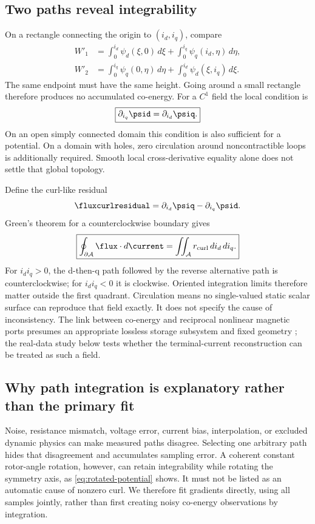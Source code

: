 \subsection{Two paths reveal integrability}
On a rectangle connecting the origin to $(i_d,i_q)$, compare
\begin{align}
 W'_1&=\int_0^{i_d}\psi_d(\xi,0)\,d\xi
        +\int_0^{i_q}\psi_q(i_d,\eta)\,d\eta,\\
 W'_2&=\int_0^{i_q}\psi_q(0,\eta)\,d\eta
        +\int_0^{i_d}\psi_d(\xi,i_q)\,d\xi.
\end{align}
The same endpoint must have the same height. Going around a small rectangle
therefore produces no accumulated co-energy. For a $C^1$ field the local
condition is
\begin{equation}
 \boxed{\partial_{i_q}\psid=\partial_{i_d}\psiq.}\label{eq:integrability}
\end{equation}
On an open simply connected domain this condition is also sufficient for a
potential. On a domain with holes, zero circulation around noncontractible
loops is additionally required. Smooth local cross-derivative equality alone
does not settle that global topology.

Define the curl-like residual
\begin{equation}
\fluxcurlresidual=\partial_{i_d}\psiq-\partial_{i_q}\psid.
\end{equation}
Green's theorem for a counterclockwise boundary gives
\begin{equation}
 \boxed{\oint_{\partial\mathcal A}\flux\cdot d\current
        =\iint_{\mathcal A}r_{\rm curl}\,di_d\,di_q.}
 \label{eq:green}
\end{equation}
For $i_di_q>0$, the d-then-q path followed by the reverse alternative
path is counterclockwise; for $i_di_q<0$ it is clockwise. Oriented integration
limits therefore matter outside the first quadrant. Circulation means no
single-valued static scalar surface can
reproduce that field exactly. It does not specify the cause of inconsistency.
The link between co-energy and reciprocal nonlinear magnetic ports presumes
an appropriate lossless storage subsystem and fixed geometry
\cite[Sec.~11.7]{haus1989}; the real-data study below tests whether the
terminal-current reconstruction can be treated as such a field.


\subsection{Why path integration is explanatory rather than the primary fit}
Noise, resistance mismatch, voltage error, current bias, interpolation, or
excluded dynamic physics can make measured paths disagree. Selecting one
arbitrary path hides that disagreement and accumulates sampling error.
A coherent constant rotor-angle rotation, however, can retain integrability
while rotating the symmetry axis, as \cref{eq:rotated-potential} shows.
It must not be listed as an automatic cause of nonzero curl.
We therefore fit gradients directly, using all samples jointly, rather than
first creating noisy co-energy observations by integration.

